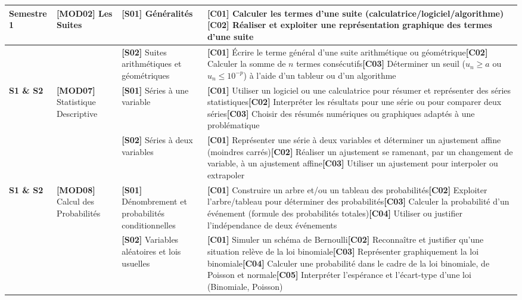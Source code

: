 \documentclass[a4paper,10pt,landscape]{article}
\begin{document}
\begin{longtable}{>{\raggedright\arraybackslash}p{2.2cm} >{\raggedright\arraybackslash}p{3cm} >{\raggedright\arraybackslash}p{3.5cm} >{\raggedright\arraybackslash}p{13.2cm}}
\midrule
\textbf{Semestre 1} & \textbf{[MOD02]} Les Suites & \textbf{[S01]} Généralités & \textbf{[C01]} Calculer les termes d'une suite (calculatrice/logiciel/algorithme)\newline \textbf{[C02]} Réaliser et exploiter une représentation graphique des termes d'une suite \\
\cmidrule(l){3-4}
 &  & \textbf{[S02]} Suites arithmétiques et géométriques & \textbf{[C01]} Écrire le terme général d'une suite arithmétique ou géométrique\newline \textbf{[C02]} Calculer la somme de $n$ termes consécutifs\newline \textbf{[C03]} Déterminer un seuil ($u_n \geq a$ ou $u_n \leq 10^{-p}$) à l'aide d'un tableur ou d'un algorithme \\
\midrule
\textbf{S1 \& S2} & \textbf{[MOD07]} Statistique Descriptive & \textbf{[S01]} Séries à une variable & \textbf{[C01]} Utiliser un logiciel ou une calculatrice pour résumer et représenter des séries statistiques\newline \textbf{[C02]} Interpréter les résultats pour une série ou pour comparer deux séries\newline \textbf{[C03]} Choisir des résumés numériques ou graphiques adaptés à une problématique \\
\cmidrule(l){3-4}
 &  & \textbf{[S02]} Séries à deux variables & \textbf{[C01]} Représenter une série à deux variables et déterminer un ajustement affine (moindres carrés)\newline \textbf{[C02]} Réaliser un ajustement se ramenant, par un changement de variable, à un ajustement affine\newline \textbf{[C03]} Utiliser un ajustement pour interpoler ou extrapoler \\
\midrule
\textbf{S1 \& S2} & \textbf{[MOD08]} Calcul des Probabilités & \textbf{[S01]} Dénombrement et probabilités conditionnelles & \textbf{[C01]} Construire un arbre et/ou un tableau des probabilités\newline \textbf{[C02]} Exploiter l'arbre/tableau pour déterminer des probabilités\newline \textbf{[C03]} Calculer la probabilité d'un événement (formule des probabilités totales)\newline \textbf{[C04]} Utiliser ou justifier l'indépendance de deux événements \\
\cmidrule(l){3-4}
 &  & \textbf{[S02]} Variables aléatoires et lois usuelles & \textbf{[C01]} Simuler un schéma de Bernoulli\newline \textbf{[C02]} Reconnaître et justifier qu'une situation relève de la loi binomiale\newline \textbf{[C03]} Représenter graphiquement la loi binomiale\newline \textbf{[C04]} Calculer une probabilité dans le cadre de la loi binomiale, de Poisson et normale\newline \textbf{[C05]} Interpréter l'espérance et l'écart-type d'une loi (Binomiale, Poisson) \\

\end{longtable}
\end{document}
